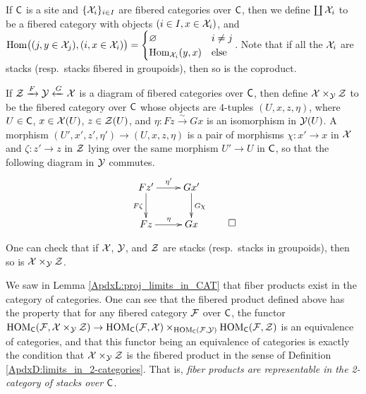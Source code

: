 
 \begin{definition}[Coproducts]
   If $\text{\sf C}$ is a site and $\{\mathcal{X}_i\}_{i\in I}$ are fibered categories over $\text{\sf C}$, then we define $\coprod \mathcal{X}_i$ to be a fibered category with objects $(i\in I,x\in \mathcal{X}_i)$, and $\operatorname{Hom}\bigl((j,y\in \mathcal{X}_j),(i,x\in \mathcal{X}_i)\bigr)=\begin{cases} \varnothing & i\neq j\\ \operatorname{Hom}_{\mathcal{X}_i}(y,x) & \text{else} \end{cases}$. Note that if all the $\mathcal{X}_i$ are stacks (resp.~stacks fibered in groupoids), then so is the coproduct.
 \end{definition}
 \begin{definition}
   If $\mathcal{Z}\xrightarrow F \mathcal{Y} \xleftarrow G \mathcal{X}$ is a diagram of fibered categories over $\text{\sf C}$, then define $\mathcal{X}\times_{\mathcal{Y}} \mathcal{Z}$ to be the fibered category over $\text{\sf C}$ whose objects are 4-tuples $(U,x,z,\eta)$, where $U\in \text{\sf C}$, $x\in\mathcal{X}(U)$, $z\in \mathcal{Z}(U)$, and $\eta:Fz\xrightarrow\sim Gx$ is an isomorphism in $\mathcal{Y}(U)$. A morphism $(U',x',z',\eta')\to (U,x,z,\eta)$ is a pair of morphisms $\chi:x'\to x$ in $\mathcal{X}$ and $\zeta:z'\to z$ in $\mathcal{Z}$ lying over the same morphism $U'\to U$ in $\text{\sf C}$, so that the following diagram in $\mathcal{Y}$ commutes.
 \[\raisebox{3pc}{$\xymatrix{
    Fz' \ar[r]^{\eta'} \ar[d]_{F\zeta} & Gx'\ar[d]^{G\chi}\\
    Fz \ar[r]^\eta & Gx
 }$}\qedhere\]
 \end{definition}
 One can check that if $\mathcal{X}$, $\mathcal{Y}$, and $\mathcal{Z}$ are stacks (resp.~stacks in groupoids), then
 so is $\mathcal{X}\times_{\mathcal{Y}}\mathcal{Z}$.

 We saw in Lemma \ref{ApdxL:proj_limits_in_CAT} that fiber products exist in the category
 of categories. One can see that the fibered product defined above has the property that
 for any fibered category $\mathcal{F}$ over $\text{\sf C}$, the functor
 $\operatorname{HOM}_{\text{\sf C}}(\mathcal{F},\mathcal{X}\times_{\mathcal{Y}}\mathcal{Z})\to \operatorname{HOM}_{\text{\sf C}}(\mathcal{F},\mathcal{X})\times_{\operatorname{HOM}_{\text{\sf C}}(\mathcal{F},\mathcal{Y})}\operatorname{HOM}_{\text{\sf C}}(\mathcal{F},\mathcal{Z})$ is an
 equivalence of categories, and that this functor being an equivalence of categories is
 exactly the condition that $\mathcal{X}\times_{\mathcal{Y}}\mathcal{Z}$ is the fibered product in the sense of
 Definition \ref{ApdxD:limits_in_2-categories}. That is, \emph{fiber products are
 representable in the 2-category of stacks over $\text{\sf C}$}.

